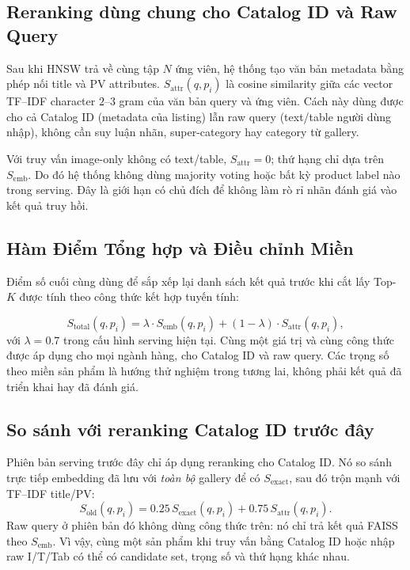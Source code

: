 \documentclass[10pt,conference]{IEEEtran}
\begin{document}
\subsection{Reranking dùng chung cho Catalog ID và Raw Query}

Sau khi HNSW trả về cùng tập $N$ ứng viên, hệ thống tạo văn bản metadata bằng phép nối title và PV attributes. $S_{\mathrm{attr}}(q,p_i)$ là cosine similarity giữa các vector TF--IDF character $2$--$3$ gram của văn bản query và ứng viên. Cách này dùng được cho cả Catalog ID (metadata của listing) lẫn raw query (text/table người dùng nhập), không cần suy luận nhãn, super-category hay category từ gallery.

Với truy vấn image-only không có text/table, $S_{\mathrm{attr}}=0$; thứ hạng chỉ dựa trên $S_{\mathrm{emb}}$. Do đó hệ thống không dùng majority voting hoặc bất kỳ product label nào trong serving. Đây là giới hạn có chủ đích để không làm rò rỉ nhãn đánh giá vào kết quả truy hồi.

\subsection{Hàm Điểm Tổng hợp và Điều chỉnh Miền}

Điểm số cuối cùng dùng để sắp xếp lại danh sách kết quả trước khi cắt lấy Top-$K$ được tính theo công thức kết hợp tuyến tính:

\begin{equation}
S_{\mathrm{total}}(q, p_i) = \lambda \cdot S_{\mathrm{emb}}(q, p_i) + (1 - \lambda) \cdot S_{\mathrm{attr}}(q, p_i),
\end{equation}
với $\lambda=0.7$ trong cấu hình serving hiện tại. Cùng một giá trị và cùng công thức được áp dụng cho mọi ngành hàng, cho Catalog ID và raw query. Các trọng số theo miền sản phẩm là hướng thử nghiệm trong tương lai, không phải kết quả đã triển khai hay đã đánh giá.

\subsection{So sánh với reranking Catalog ID trước đây}

Phiên bản serving trước đây chỉ áp dụng reranking cho Catalog ID. Nó so sánh trực tiếp embedding đã lưu với \emph{toàn bộ} gallery để có $S_{\mathrm{exact}}$, sau đó trộn mạnh với TF--IDF title/PV:
\begin{equation}
S_{\mathrm{old}}(q,p_i)=0.25\,S_{\mathrm{exact}}(q,p_i)+0.75\,S_{\mathrm{attr}}(q,p_i).
\end{equation}
Raw query ở phiên bản đó không dùng công thức trên: nó chỉ trả kết quả FAISS theo $S_{\mathrm{emb}}$. Vì vậy, cùng một sản phẩm khi truy vấn bằng Catalog ID hoặc nhập raw I/T/Tab có thể có candidate set, trọng số và thứ hạng khác nhau.
\end{document}
